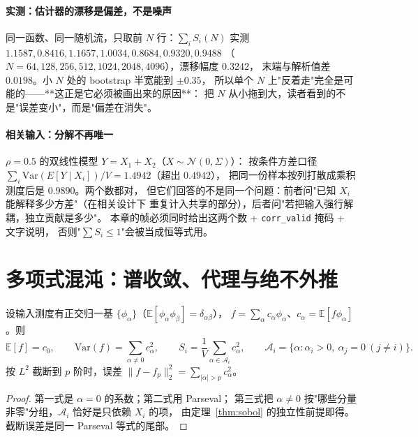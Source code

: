 \paragraph{实测：估计器的漂移是偏差，不是噪声}
同一函数、同一随机流，只取前 $N$ 行：$\sum_iS_i(N)$ 实测
$1.1587,0.8416,1.1657,1.0034,0.8684,0.9320,0.9488$
（$N=64,128,256,512,1024,2048,4096$），漂移幅度 $0.3242$，
末端与解析值差 $0.0198$。小 $N$ 处的 bootstrap 半宽能到 $\pm0.35$，
所以单个 $N$ 上"反着走"完全是可能的——**这正是它必须被画出来的原因**：
把 $N$ 从小拖到大，读者看到的不是"误差变小"，而是"偏差在消失"。

\paragraph{相关输入：分解不再唯一}
$\rho=0.5$ 的双线性模型 $Y=X_1+X_2$（$X\sim\mathcal N(0,\Sigma)$）：
按条件方差口径 $\sum_i\mathrm{Var}(E[Y\mid X_i])/V=1.4942$（超出 $0.4942$），
把同一份样本按列打散成乘积测度后是 $0.9890$。两个数都对，
但它们回答的不是同一个问题：前者问"已知 $X_i$ 能解释多少方差"（在相关设计下
重复计入共享的部分），后者问"若把输入强行解耦，独立贡献是多少"。
本章的帧必须同时给出这两个数 + \texttt{corr\_valid} 掩码 + 文字说明，
否则"$\sum S_i\le1$"会被当成恒等式用。

\section{多项式混沌：谱收敛、代理与绝不外推}\label{sec:pce}

\begin{theorem}\label{thm:pce}
设输入测度有正交归一基 $\{\phi_\alpha\}$（$\mathbb{E}[\phi_\alpha\phi_\beta]=\delta_{\alpha\beta}$），
$f=\sum_\alpha c_\alpha\phi_\alpha$、$c_\alpha=\mathbb{E}[f\phi_\alpha]$。则
\[
  \mathbb{E}[f]=c_0,\qquad
  \mathrm{Var}(f)=\sum_{\alpha\ne0}c_\alpha^2,\qquad
  S_i=\frac{1}{V}\sum_{\alpha\in\mathcal A_i}c_\alpha^2,\qquad
  \mathcal A_i=\{\alpha:\alpha_i>0,\ \alpha_j=0\ (j\ne i)\}.
\]
按 $L^2$ 截断到 $p$ 阶时，误差 $\lVert f-f_p\rVert_2^2=\sum_{\lvert\alpha\rvert>p}c_\alpha^2$。
\end{theorem}

\begin{proof}
第一式是 $\alpha=0$ 的系数；第二式用 Parseval；
第三式把 $\alpha\ne0$ 按"哪些分量非零"分组，$\mathcal A_i$ 恰好是只依赖 $X_i$ 的项，
由定理~\ref{thm:sobol} 的独立性前提即得。截断误差是同一 Parseval 等式的尾部。
\end{proof}

